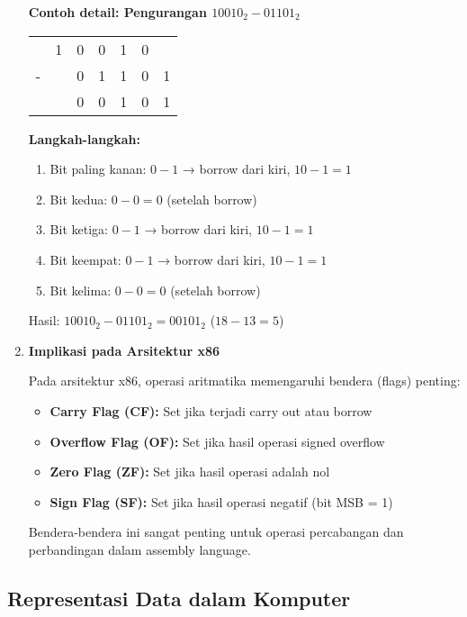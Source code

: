 \begin{enumerate}
\textbf{Contoh detail: Pengurangan \(10010_2 - 01101_2\)}

\begin{center}
\begin{tabular}{ccccccc}
  & 1 & 0 & 0 & 1 & 0 & \\
- &   & 0 & 1 & 1 & 0 & 1 \\
\hline
  &   & 0 & 0 & 1 & 0 & 1 \\
\end{tabular}
\end{center}

\textbf{Langkah-langkah:}
\begin{enumerate}
    \item Bit paling kanan: \(0 - 1\) → borrow dari kiri, \(10 - 1 = 1\)
    \item Bit kedua: \(0 - 0 = 0\) (setelah borrow)
    \item Bit ketiga: \(0 - 1\) → borrow dari kiri, \(10 - 1 = 1\)
    \item Bit keempat: \(0 - 1\) → borrow dari kiri, \(10 - 1 = 1\)
    \item Bit kelima: \(0 - 0 = 0\) (setelah borrow)
\end{enumerate}

Hasil: \(10010_2 - 01101_2 = 00101_2\) (\(18 - 13 = 5\))

\item \textbf{Implikasi pada Arsitektur x86}

Pada arsitektur x86, operasi aritmatika memengaruhi bendera (flags) penting:
\begin{itemize}
    \item \textbf{Carry Flag (CF):} Set jika terjadi carry out atau borrow
    \item \textbf{Overflow Flag (OF):} Set jika hasil operasi signed overflow
    \item \textbf{Zero Flag (ZF):} Set jika hasil operasi adalah nol
    \item \textbf{Sign Flag (SF):} Set jika hasil operasi negatif (bit MSB = 1)
\end{itemize}

Bendera-bendera ini sangat penting untuk operasi percabangan dan perbandingan dalam assembly language.
\end{enumerate}

\subsection{Representasi Data dalam Komputer}\label{subsec:pengenalan-representasi-data}

